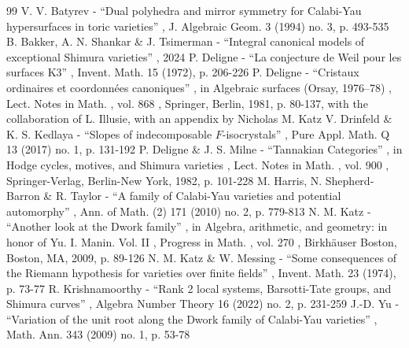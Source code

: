 \documentclass[11pt]{article}
\numberwithin{equation}{subsection}
\theoremstyle{definition}
\begin{document}
\begin{thebibliography}{99}
 V. V. Batyrev - “Dual polyhedra and mirror symmetry for Calabi-Yau hypersurfaces in toric varieties” , J. Algebraic Geom. 3 (1994) no. 3, p. 493-535
 B. Bakker, A. N. Shankar \& J. Tsimerman - “Integral canonical models of exceptional Shimura varieties” , 2024
 P. Deligne - “La conjecture de Weil pour les surfaces K3” , Invent. Math. 15 (1972), p. 206-226
 P. Deligne - “Cristaux ordinaires et coordonnées canoniques” , in Algebraic surfaces (Orsay, 1976–78) , Lect. Notes in Math. , vol. 868 , Springer, Berlin, 1981, p. 80-137, with the collaboration of L. Illusie, with an appendix by Nicholas M. Katz
 V. Drinfeld \& K. S. Kedlaya - “Slopes of indecomposable $F$-isocrystals” , Pure Appl. Math. Q 13 (2017) no. 1, p. 131-192
 P. Deligne \& J. S. Milne - “Tannakian Categories” , in Hodge cycles, motives, and Shimura varieties , Lect. Notes in Math. , vol. 900 , Springer-Verlag, Berlin-New York, 1982, p. 101-228
 M. Harris, N. Shepherd-Barron \& R. Taylor - “A family of Calabi-Yau varieties and potential automorphy” , Ann. of Math. (2) 171 (2010) no. 2, p. 779-813
 N. M. Katz - “Another look at the Dwork family” , in Algebra, arithmetic, and geometry: in honor of Yu. I. Manin. Vol. II , Progress in Math. , vol. 270 , Birkhäuser Boston, Boston, MA, 2009, p. 89-126
 N. M. Katz \& W. Messing - “Some consequences of the Riemann hypothesis for varieties over finite fields” , Invent. Math. 23 (1974), p. 73-77
 R. Krishnamoorthy - “Rank 2 local systems, Barsotti-Tate groups, and Shimura curves” , Algebra Number Theory 16 (2022) no. 2, p. 231-259
 J.-D. Yu - “Variation of the unit root along the Dwork family of Calabi-Yau varieties” , Math. Ann. 343 (2009) no. 1, p. 53-78
\end{thebibliography}
\end{document}
